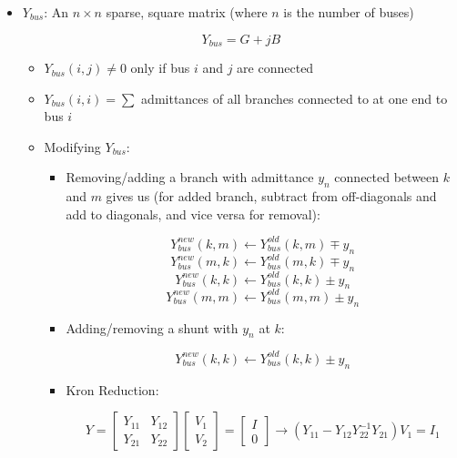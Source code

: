 \begin{itemize}
  \item $Y_{bus}$: An $n\times n$ sparse, square matrix (where $n$ is the number of buses)

    $$Y_{bus}=G+jB$$

    \begin{itemize}

      \item $Y_{bus}(i,j)\neq0$ only if bus $i$ and $j$ are connected

      \item $Y_{bus}(i,i)=\sum$ admittances of all branches connected to at one end to bus $i$

      \item Modifying $Y_{bus}$:

        \begin{itemize}

          \item Removing/adding a branch with admittance $y_n$ connected between $k$ and $m$ gives us (for added branch, subtract from off-diagonals and add to diagonals, and vice versa for removal):

            $$Y_{bus}^{new}(k,m)\leftarrow Y_{bus}^{old}(k,m)\mp y_n$$
            $$Y_{bus}^{new}(m,k)\leftarrow Y_{bus}^{old}(m,k)\mp y_n$$
            $$Y_{bus}^{new}(k,k)\leftarrow Y_{bus}^{old}(k,k)\pm y_n$$
            $$Y_{bus}^{new}(m,m)\leftarrow Y_{bus}^{old}(m,m)\pm y_n$$

          \item Adding/removing a shunt with $y_n$ at $k$:

            $$Y_{bus}^{new}(k,k)\leftarrow Y_{bus}^{old}(k,k)\pm y_n$$

          \item Kron Reduction:

            $$Y=\left[ \begin{matrix} Y_{11} & Y_{12}\\ Y_{21} & Y_{22} \end{matrix}\right]\left[ \begin{matrix} V_1\\V_2 \end{matrix}\right]=\left[ \begin{matrix} I\\0\end{matrix} \right]\to (Y_{11}-Y_{12}Y^{-1}_{22}Y_{21})V_1=I_1$$

        \end{itemize}

    \end{itemize}


\end{itemize}
